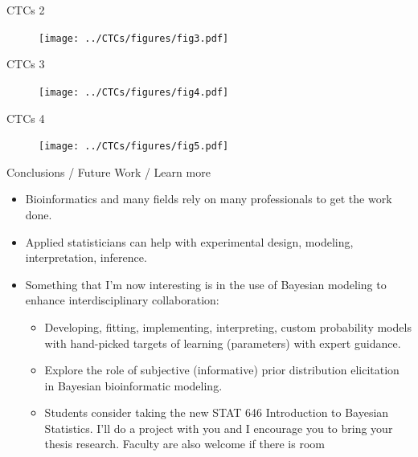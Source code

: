 \documentclass[ignorenonframetext,aspectratio=169,]{beamer}
\providecommand{\tightlist}{%
  \setlength{\itemsep}{0pt}\setlength{\parskip}{0pt}}
\begin{document}
\begin{frame}{%
\protect\hypertarget{ctcs-2}{%
CTCs 2}}

\begin{figure}[htb]
  \centering \texttt{[image: ../CTCs/figures/fig3.pdf]}
\end{figure}

\end{frame}

\begin{frame}{%
\protect\hypertarget{ctcs-3}{%
CTCs 3}}

\begin{figure}[htb]
  \centering \texttt{[image: ../CTCs/figures/fig4.pdf]}
\end{figure}

\end{frame}

\begin{frame}{%
\protect\hypertarget{ctcs-4}{%
CTCs 4}}

\begin{figure}[htb]
  \centering \texttt{[image: ../CTCs/figures/fig5.pdf]}
\end{figure}

\end{frame}

\begin{frame}{%
\protect\hypertarget{conclusions-future-work-learn-more}{%
Conclusions / Future Work / Learn more}}

\begin{itemize}
\item
  Bioinformatics and many fields rely on many professionals to get the
  work done.
\item
  Applied statisticians can help with experimental design, modeling,
  interpretation, inference.
\item
  Something that I’m now interesting is in the use of Bayesian modeling
  to enhance interdisciplinary collaboration:

  \begin{itemize}
  \tightlist
  \item
    Developing, fitting, implementing, interpreting, custom probability
    models with hand-picked targets of learning (parameters) with expert
    guidance.
  \item
    Explore the role of subjective (informative) prior distribution
    elicitation in Bayesian bioinformatic modeling.
  \item
    Students consider taking the new STAT 646 Introduction to Bayesian
    Statistics. I’ll do a project with you and I encourage you to bring
    your thesis research. Faculty are also welcome if there is room
  \end{itemize}
\end{itemize}

\end{frame}
\end{document}
